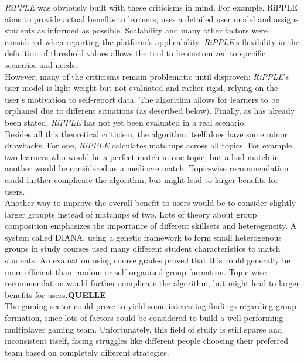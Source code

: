 \documentclass[conference]{IEEEtran}
\begin{document}
\textit{RiPPLE} was obviously built with these criticisms in mind. For example, RiPPLE aims to provide actual benefits to learners, uses a detailed user model and assigns students as informed as possible. Scalability and many other factors were considered when reporting the platform's applicability. \textit{RiPPLE}'s flexibility in the definition of threshold values allows the tool to be customized to specific scenarios and needs.\\ However, many of the criticisms remain problematic until disproven: \textit{RiPPLE}'s user model is light-weight but not evaluated and rather rigid, relying on the user's motivation to self-report data. The algorithm allows for learners to be orphaned due to different situations (as described below). Finally, as has already been stated, \textit{RiPPLE} has not yet been evaluated in a real scenario.\\
Besides all this theoretical criticism, the algorithm itself does have some minor drawbacks. For one, \textit{RiPPLE} calculates matchups across all topics. For example, two learners who would be a perfect match in one topic, but a bad match in another would be considered as a mediocre match. Topic-wise recommendation could further complicate the algorithm, but might lead to larger benefits for users.\\
Another way to improve the overall benefit to users would be to consider slightly larger groupts instead of matchups of two. Lots of theory about group composition emphasizes the importance of different skillsets and heterogeneity. \cite{olakanmi2017group, blumenfeld1996learning, manske2015using} A system called DIANA, using a genetic framework to form small heterogenous groups in study courses used many different student characteristics to match students. An evaluation using course grades proved that this could generally be more efficient than random or self-organised group formation. Topic-wise recommendation would further complicate the algorithm, but might lead to larger benefits for users.\textbf{QUELLE}\\
The gaming sector could prove to yield some interesting findings regarding group formation, since lots of factors could be considered to build a well-performing multiplayer gaming team. \cite{delalleau2012beyond, wang2015thinking, suznjevic2015application} Unfortunately, this field of study is still sparse and inconsistent itself, facing struggles like different people choosing their preferred team based on completely different strategies. \cite{riegelsberger2007personality}\\
\end{document}
